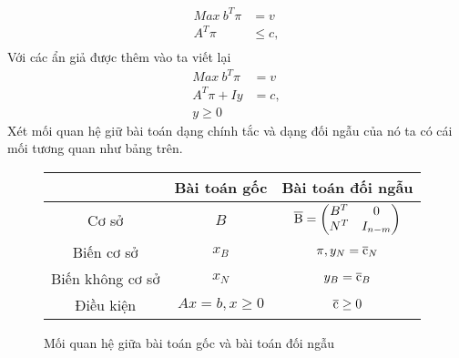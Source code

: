 \documentclass{article}
\begin{document}
\begin{enumerate}
\begin{equation}
\begin{split}
                        Max \: b^T\pi &= v\\
                        A^T\pi & \le c,\\
                    \end{split}
                \end{equation}
                Với các ẩn giả được thêm vào ta viết lại
                \begin{equation}
                    \begin{split}
                        Max \: b^T\pi &= v\\
                        A^T\pi +Iy &= c,\\
                        y \geq 0
                    \end{split}
                \end{equation}
                Xét mối quan hệ giữ bài toán dạng chính tắc và dạng đối ngẫu của nó ta có cái mối tương quan như bảng trên.
                \begin{figure} \label{MQH}
                    \caption{Mối quan hệ giữa bài toán gốc và bài toán đối ngẫu}
                        \begin{center}
                            \begin{tabular} {|c|c|c|}
                                \hline
                                & Bài toán gốc & Bài toán đối 
                                ngẫu \\
                                \hline
                                Cơ sở & $B$ & $\overline{\rm B} =
                                \begin{pmatrix}
                                    B^T & 0 \\
                                    N^T & I_{n-m}
                                \end{pmatrix}$ \\
                                \hline
                                Biến cơ sở & $x_B$ & $\pi,y_N=\overline{\rm c}_N$ \\
                                \hline
                                Biến không cơ sở & $x_N$ & $y_B=\overline{\rm c}_B$ \\
                                \hline
                                Điều kiện & $Ax=b,x \geq 0$ & $\overline{\rm c} \geq 0$ \\
                                \hline
                            \end{tabular}
                        \end{center}
                    \end{figure}


\end{enumerate}
\end{document}
